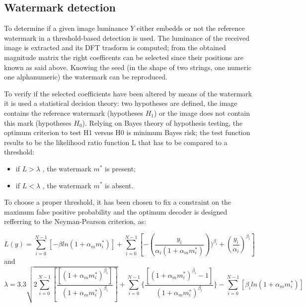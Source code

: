 \subsection{Watermark detection}

To determine if a given image luminance $Y$ either embedds or not the reference watermark in \cite{PIVA} a threshold-based detection is used.\newline
The luminance of the received image is extracted and its DFT trasform is computed; from the obtained magnitude matrix the right coefficents can be selected since their positions are known as said above.\newline
Knowing the seed (in the shape of two strings, one numeric one alphanumeric) the watermark can be reproduced.\newline

To verify if the selected coefficients have been altered by means of the watermark it is used a statistical decision theory: two hypotheses are defined, the image contains the reference watermark (hypotheses $H_{1}$) or the image does not contain this mark (hypotheses $H_{0}$). Relying on Bayes theory of hypothesis testing, the optimum criterion to test H1 versus H0 is minimum Bayes risk; the test function results to be the likelihood ratio function L that has to be compared to a threshold:\newline
\begin{itemize}
\item if $L > \lambda$ ,  the watermark $m^{*}$ is present;
\item if $L < \lambda$ , the watermark  $m^{*}$ is absent.
\end{itemize}

To choose a proper threshold, it has been chosen to fix a constraint on the maximum false positive probability and the optimum decoder is designed refferring to the Neyman-Pearson criterion, as: \newline

$$ L(y)=\sum_{i=0}^{N-1} [-\beta ln(1+\alpha_{m}m_{i}^{*})]+\sum_{i=0}^{N-1}[-(\frac{y_{i}}{\alpha_{i}(1+\alpha_{m}m_{i}^{*})}))^{\beta_{i}}+(\frac{y_{i}}{\alpha_{i}})^{\beta_{i}}] $$
and
$$\lambda=3.3\sqrt{2\sum_{i=0}^{N-1}[\frac{[(1+\alpha_{m}m_{i}^{*})^{\beta_{i}}]}{(1+\alpha_{m}m_{i}^{*})^{\beta_{i}}}]} + \sum_{i=0}^{N-1}\{\frac{[(1+\alpha_{m}m_{i}^{*})^{\beta_{i}}-1]}{(1+\alpha_{m}m_{i}^{*})^{\beta_{i}}}\} - \sum_{i=0}^{N-1}[\beta_{i}ln(1+\alpha_{m}m_{i}^{*})]$$

